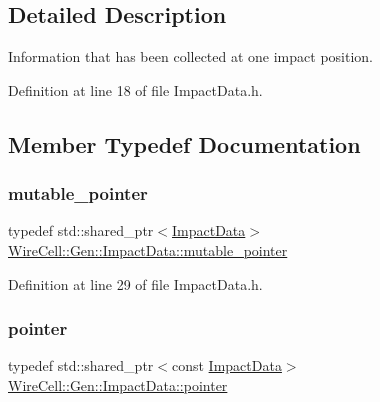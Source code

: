 \subsection{Detailed Description}
Information that has been collected at one impact position. 

Definition at line 18 of file Impact\+Data.\+h.



\subsection{Member Typedef Documentation}
\mbox{\label{class_wire_cell_1_1_gen_1_1_impact_data_a6a085b06dc01a1c1b1cd44fb4a034f83}} 
\subsubsection{\texorpdfstring{mutable\+\_\+pointer}{mutable\_pointer}}
{\footnotesize\ttfamily typedef std\+::shared\+\_\+ptr$<$\hyperlink{class_wire_cell_1_1_gen_1_1_impact_data}{Impact\+Data}$>$ \hyperlink{class_wire_cell_1_1_gen_1_1_impact_data_a6a085b06dc01a1c1b1cd44fb4a034f83}{Wire\+Cell\+::\+Gen\+::\+Impact\+Data\+::mutable\+\_\+pointer}}



Definition at line 29 of file Impact\+Data.\+h.

\mbox{\label{class_wire_cell_1_1_gen_1_1_impact_data_a4fb9b565e1525c7ccde05ded67f467c2}} 
\subsubsection{\texorpdfstring{pointer}{pointer}}
{\footnotesize\ttfamily typedef std\+::shared\+\_\+ptr$<$const \hyperlink{class_wire_cell_1_1_gen_1_1_impact_data}{Impact\+Data}$>$ \hyperlink{class_wire_cell_1_1_gen_1_1_impact_data_a4fb9b565e1525c7ccde05ded67f467c2}{Wire\+Cell\+::\+Gen\+::\+Impact\+Data\+::pointer}}



